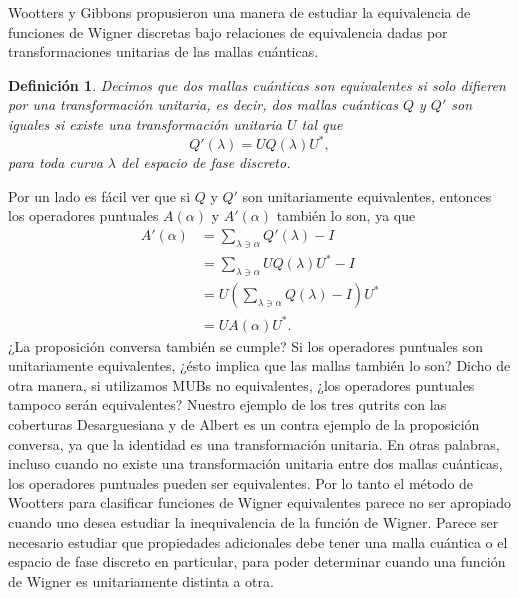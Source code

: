 \documentclass[a4paper,11pt]{report}
\newtheorem{definition}{Definición}
\begin{document}
  Wootters y Gibbons propusieron una manera de estudiar la
  equivalencia de funciones de Wigner discretas bajo
  relaciones de equivalencia dadas por transformaciones
  unitarias de las mallas cuánticas.
  \begin{definition}
    Decimos que dos mallas cuánticas son equivalentes si
    solo difieren por una transformación unitaria, es decir,
    dos mallas cuánticas $Q$ y $Q'$ son iguales si existe
    una transformación unitaria $U$ tal que
    \begin{equation}
      Q'(\lambda)
      = U Q(\lambda) U^{*},
    \end{equation}
    para toda curva $\lambda$ del espacio de fase discreto.
  \end{definition}
  Por un lado es fácil ver que si $Q$ y $Q'$ son
  unitariamente equivalentes, entonces los operadores
  puntuales $A(\alpha)$ y $A'(\alpha)$ también lo son, ya
  que
  \begin{align}
    A'(\alpha)
    &= \sum_{\lambda \ni \alpha}^{} Q'(\lambda) - I \\
    &= \sum_{\lambda \ni \alpha}^{} U Q(\lambda) U^{*} - I
    \\
    &= U \left( 
      \sum_{\lambda \ni \alpha}^{} Q(\lambda) - I
    \right) U^{*} \\
    &= U A(\alpha) U^{*}.
  \end{align}
  ¿La proposición conversa también se cumple? Si los
  operadores puntuales son unitariamente equivalentes, ¿ésto
  implica que las mallas también lo son? Dicho de otra
  manera, si utilizamos MUBs no equivalentes, ¿los
  operadores puntuales tampoco serán equivalentes?  Nuestro
  ejemplo de los tres qutrits con las coberturas
  Desarguesiana y de Albert es un contra ejemplo de la
  proposición conversa, ya que la identidad es una
  transformación unitaria. En otras palabras, incluso cuando
  no existe una transformación unitaria entre dos mallas
  cuánticas, los operadores puntuales pueden ser
  equivalentes. Por lo tanto el método de Wootters para
  clasificar funciones de Wigner equivalentes parece no ser
  apropiado cuando uno desea estudiar la inequivalencia de
  la función de Wigner.  Parece ser necesario estudiar que
  propiedades adicionales debe tener una malla cuántica o el
  espacio de fase discreto en particular, para poder
  determinar cuando una función de Wigner es unitariamente
  distinta a otra. 
\end{document}
